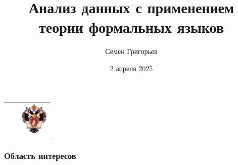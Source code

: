 \documentclass[xcolor=table,aspectratio=169]{beamer}
\title[Анализ данных и формальные языки]{Анализ данных с применением теории формальных языков}
\institute[СПбГУ]{
Санкт-Петербургский Государственный Университет
}
\author[Семён Григорьев]{Семён Григорьев}
\date{2 апреля 2025}
\begin{document}
{
\begin{frame}[fragile]
  \begin{table}
  \centering
  \begin{tabularx}{\linewidth}{XcX}
    \hfill
    & 
    & \hfill \includegraphics[height=1.6cm]{pictures/SPbGU_Logo.png}
  \end{tabularx}
  \end{table}
  \titlepage
\end{frame}
}

\begin{frame}[fragile]
  \frametitle{Область интересов}
  

\end{frame}
\end{document}
